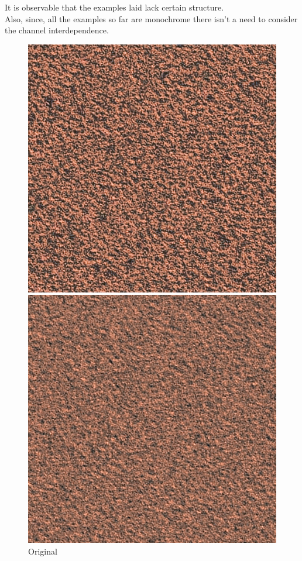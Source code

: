 \documentclass{article}
\begin{document}
    
    It is observable that the examples laid lack certain structure.\\[5pt]
    Also, since, all the examples so far are monochrome there isn't a need to consider the channel interdependence.
    
\pagebreak

    \begin{figure}[!htb]
    \begin{center}
      \includegraphics[scale=.4]{5/report/random/1.png}
      \caption{Original}
    \end{center}
    \endminipage \hfill
    \begin{center}
      \includegraphics[scale=.4]{5/report/random/1_c.png}

\end{center}
\end{figure}
\end{document}
